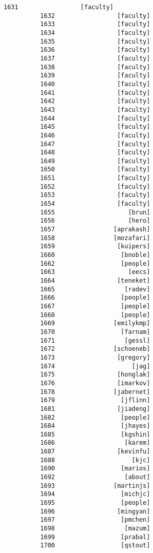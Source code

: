 \documentclass[11pt]{article}
\begin{document}
\begin{Verbatim}[commandchars=\\\{\}]
          1631                 [faculty]
          1632                 [faculty]
          1633                 [faculty]
          1634                 [faculty]
          1635                 [faculty]
          1636                 [faculty]
          1637                 [faculty]
          1638                 [faculty]
          1639                 [faculty]
          1640                 [faculty]
          1641                 [faculty]
          1642                 [faculty]
          1643                 [faculty]
          1644                 [faculty]
          1645                 [faculty]
          1646                 [faculty]
          1647                 [faculty]
          1648                 [faculty]
          1649                 [faculty]
          1650                 [faculty]
          1651                 [faculty]
          1652                 [faculty]
          1653                 [faculty]
          1654                 [faculty]
          1655                    [brun]
          1656                    [hero]
          1657                [aprakash]
          1658                [mozafari]
          1659                 [kuipers]
          1660                  [bnoble]
          1662                  [people]
          1663                    [eecs]
          1664                 [teneket]
          1665                   [radev]
          1666                  [people]
          1667                  [people]
          1668                  [people]
          1669                [emilykmp]
          1670                  [farnam]
          1671                   [gessl]
          1672                [schoeneb]
          1673                 [gregory]
          1674                     [jag]
          1675                 [honglak]
          1676                 [imarkov]
          1678                [jabernet]
          1679                  [jflinn]
          1681                 [jiadeng]
          1682                  [people]
          1684                  [jhayes]
          1685                  [kgshin]
          1686                   [karem]
          1687                 [kevinfu]
          1688                     [kjc]
          1690                  [marios]
          1692                   [about]
          1693                [martinjs]
          1694                  [michjc]
          1695                  [people]
          1696                 [mingyan]
          1697                  [pmchen]
          1698                   [mazum]
          1699                  [prabal]
          1700                  [qstout]

\end{Verbatim}
\end{document}
